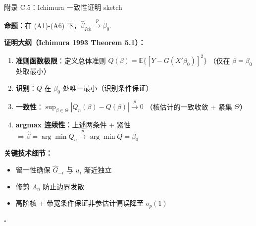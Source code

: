 \documentclass[aspectratio=169, 10pt]{beamer}
\begin{document}
\begin{frame}{附录 C.5：Ichimura 一致性证明 sketch}
  \hypertarget{proof-c5}{}

  \textbf{命题：}在 (A1)-(A6) 下，$\hat\beta_{Ich} \overset{p}{\to} \beta_0$.

  \textbf{证明大纲（Ichimura 1993 Theorem 5.1）：}
  \begin{enumerate}\setlength{\itemsep}{1pt}
    \item \textbf{准则函数极限}：定义总体准则 $Q(\beta) = \mathbb{E}\{[Y - G(X'\beta_0)]^2\}$
    （仅在 $\beta = \beta_0$ 处取最小）
    \item \textbf{识别}：$Q$ 在 $\beta_0$ 处唯一最小（识别条件保证）
    \item \textbf{一致性}：$\sup_{\beta \in \Theta} |Q_n(\beta) - Q(\beta)| \overset{p}{\to} 0$
    （核估计的一致收敛 + 紧集 $\Theta$）
    \item \textbf{argmax 连续性}：上述两条件 + 紧性 $\Rightarrow \hat\beta = \arg\min Q_n \overset{p}{\to} \arg\min Q = \beta_0$
  \end{enumerate}

  \textbf{关键技术细节：}
  \begin{itemize}\setlength{\itemsep}{1pt}
    \item 留一性确保 $\hat G_{-i}$ 与 $u_i$ 渐近独立
    \item 修剪 $A_n$ 防止边界发散
    \item 高阶核 + 带宽条件保证非参估计偏误降至 $o_p(1)$
  \end{itemize}
  $\square$
  \hfill{\scriptsize\hyperlink{main-c5}{}}

\end{frame}
\end{document}
